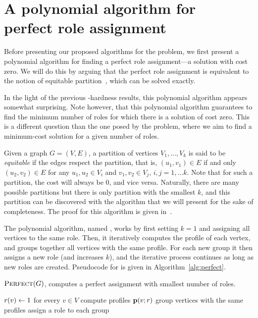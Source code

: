 \section{A polynomial algorithm for\\perfect role assignment}
\label{section:perfect}

Before presenting our proposed algorithms for the \prbrm problem, 
we first present a polynomial algorithm
for finding a perfect role assignment---a solution with cost zero.
We will do this by arguing that the perfect role assignment is equivalent
to the notion of equitable partition~\cite{McKay1978}, which can be solved exactly.

In the light of the previous \np-hardness results, this polynomial algorithm
appears somewhat surprising.  Note however, that this polynomial algorithm
guarantees to find the minimum number of roles for which there is a solution of
cost zero.  This is a different question than the one posed by the \prbrm
problem, where we aim to find a minimum-cost solution for a given number of
roles.

Given a graph $G = (V, E)$, a partition of vertices $V_1, \ldots, V_k$ is said
to be \emph{equitable} if the edges respect the partition, that is, $(u_1, v_1) \in E$ if
and only $(u_2, v_2) \in E$ for any $u_1, u_2 \in V_i$ and $v_1, v_2 \in V_j$,
$i, j = 1, \ldots k$.  Note that for such a partition, the cost will always be
0, and vice versa. Naturally, there are many possible partitions but there is only
partition with the smallest $k$, and this partition can be discovered
with the algorithm that we will present for the sake of completeness. The proof
for this algorithm is given in~\cite{McKay1978}.

The polynomial algorithm, named \algperfect, 
works by first setting $k=1$ and assigning all vertices to the same role. 
Then, it iteratively computes the profile of each vertex, 
and groups together all vertices with the same profile. 
For each new group it then assigns a new role (and increases $k$), 
and the iterative process continues as long as new roles are created. 
Pseudocode for \algperfect is given in Algorithm~\ref{alg:perfect}.

\begin{algorithm}[t]
\caption{$\textsc{Perfect}(G)$, computes a perfect assignment with smallest number of roles.}
\label{alg:perfect}
	$r(v) \leftarrow 1$ for every $v \in V$\;
	 {
		compute profiles $\prof{v; \role}$\;
		group vertices with the same profiles\;
		assign a role to each group\;
	}
\end{algorithm}

